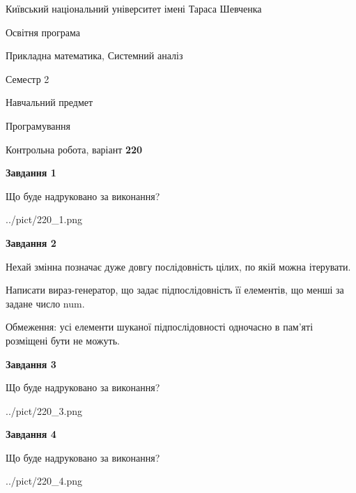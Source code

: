 \documentclass[12pt, ukrainian]{article}
\begin{document}
{{\begin {small}\par
{ \center  Київський національний університет імені Тараса Шевченка \par}
{\parbox {5 cm}{Освітня програма \hfill}{\parbox {8 cm}{Прикладна математика, Системний аналіз \hfill}}\parbox {5 cm}{\hfill Семестр 2}}\par
{\parbox {5 cm} {Навчальний предмет \hfill}\parbox {7 cm}{Програмування \hfill}\parbox {6cm}{\hfill}\par}\vspace{-7pt} \end{small}}{\center Контрольна робота, варіант  \No \textbf
{ 220 }\par}}
{
\begin {large}
{\begin {center}\textbf{Завдання 1}\end {center}}\par
Що буде надруковано за виконання?\par\par
\begin{center}
	{../pict/220_1.png}
\end{center}
\newpage

{\begin {center}\textbf{Завдання 2}\end {center}}\par
Нехай змінна  позначає дуже довгу послідовність цілих, по якій можна ітерувати.

Написати вираз-генератор, що задає підпослідовність її елементів, що менші за задане число num.

Обмеження: усі елементи шуканої підпослідовності одночасно в пам'яті розміщені бути не можуть.\par
\newpage

{\begin {center}\textbf{Завдання 3}\end {center}}\par
Що буде надруковано за виконання?\par
\begin{center}
	{../pict/220_3.png}
\end{center}
\newpage

{\begin {center}\textbf{Завдання 4}\end {center}}\par
Що буде надруковано за виконання?\par
\begin{center}
	{../pict/220_4.png}
\end{center}
\newpage


\end{large}}
\end{document}
